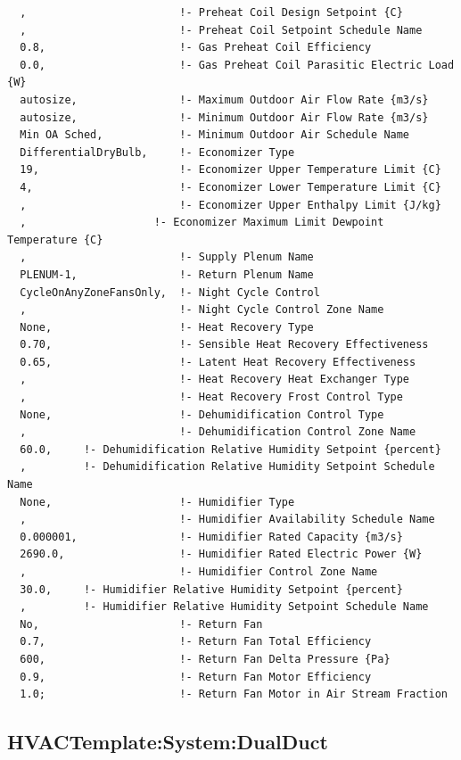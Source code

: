 \begin{lstlisting}
  ,                        !- Preheat Coil Design Setpoint {C}
  ,                        !- Preheat Coil Setpoint Schedule Name
  0.8,                     !- Gas Preheat Coil Efficiency
  0.0,                     !- Gas Preheat Coil Parasitic Electric Load {W}
  autosize,                !- Maximum Outdoor Air Flow Rate {m3/s}
  autosize,                !- Minimum Outdoor Air Flow Rate {m3/s}
  Min OA Sched,            !- Minimum Outdoor Air Schedule Name
  DifferentialDryBulb,     !- Economizer Type
  19,                      !- Economizer Upper Temperature Limit {C}
  4,                       !- Economizer Lower Temperature Limit {C}
  ,                        !- Economizer Upper Enthalpy Limit {J/kg}
  ,                    !- Economizer Maximum Limit Dewpoint Temperature {C}
  ,                        !- Supply Plenum Name
  PLENUM-1,                !- Return Plenum Name
  CycleOnAnyZoneFansOnly,  !- Night Cycle Control
  ,                        !- Night Cycle Control Zone Name
  None,                    !- Heat Recovery Type
  0.70,                    !- Sensible Heat Recovery Effectiveness
  0.65,                    !- Latent Heat Recovery Effectiveness
  ,                        !- Heat Recovery Heat Exchanger Type
  ,                        !- Heat Recovery Frost Control Type
  None,                    !- Dehumidification Control Type
  ,                        !- Dehumidification Control Zone Name
  60.0,     !- Dehumidification Relative Humidity Setpoint {percent}
  ,         !- Dehumidification Relative Humidity Setpoint Schedule Name
  None,                    !- Humidifier Type
  ,                        !- Humidifier Availability Schedule Name
  0.000001,                !- Humidifier Rated Capacity {m3/s}
  2690.0,                  !- Humidifier Rated Electric Power {W}
  ,                        !- Humidifier Control Zone Name
  30.0,     !- Humidifier Relative Humidity Setpoint {percent}
  ,         !- Humidifier Relative Humidity Setpoint Schedule Name
  No,                      !- Return Fan
  0.7,                     !- Return Fan Total Efficiency
  600,                     !- Return Fan Delta Pressure {Pa}
  0.9,                     !- Return Fan Motor Efficiency
  1.0;                     !- Return Fan Motor in Air Stream Fraction
\end{lstlisting}

\subsection{HVACTemplate:System:DualDuct}\label{hvactemplatesystemdualduct}

